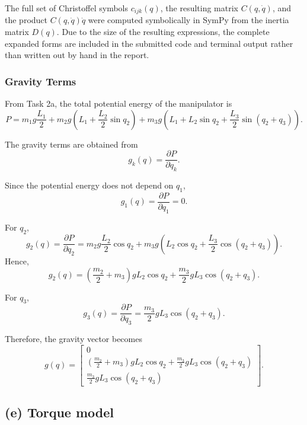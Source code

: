 \documentclass{article}
\begin{document}
The full set of Christoffel symbols \(c_{ijk}(q)\), the resulting matrix \(C(q,\dot q)\), and the product \(C(q,\dot q)\dot q\) were computed symbolically in SymPy from the inertia matrix \(D(q)\). Due to the size of the resulting expressions, the complete expanded forms are included in the submitted code and terminal output rather than written out by hand in the report.

\subsubsection*{Gravity Terms}

From Task 2a, the total potential energy of the manipulator is
\[
P
=
m_1 g \frac{L_1}{2}
+
m_2 g \left(L_1+\frac{L_2}{2}\sin q_2\right)
+
m_3 g \left(L_1+L_2 \sin q_2+\frac{L_3}{2}\sin(q_2+q_3)\right).
\]

The gravity terms are obtained from
\[
g_k(q)=\frac{\partial P}{\partial q_k}.
\]

Since the potential energy does not depend on \(q_1\),
\[
g_1(q)=\frac{\partial P}{\partial q_1}=0.
\]

For \(q_2\),
\[
g_2(q)=\frac{\partial P}{\partial q_2}
=
m_2 g \frac{L_2}{2}\cos q_2
+
m_3 g \left(L_2\cos q_2+\frac{L_3}{2}\cos(q_2+q_3)\right).
\]
Hence,
\[
g_2(q)
=
\left(\frac{m_2}{2}+m_3\right)gL_2\cos q_2
+
\frac{m_3}{2}gL_3\cos(q_2+q_3).
\]

For \(q_3\),
\[
g_3(q)=\frac{\partial P}{\partial q_3}
=
\frac{m_3}{2}gL_3\cos(q_2+q_3).
\]

Therefore, the gravity vector becomes
\[
g(q)=
\begin{bmatrix}
0\\[6pt]
\left(\frac{m_2}{2}+m_3\right)gL_2\cos q_2
+\frac{m_3}{2}gL_3\cos(q_2+q_3)\\[8pt]
\frac{m_3}{2}gL_3\cos(q_2+q_3)
\end{bmatrix}.
\]
\subsection*{(e) Torque model}
\end{document}
